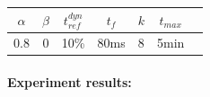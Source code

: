 		\begin{center}
		\begin{tabular}{ |c|c|c|c|c|c|c| } 
		\hline
		$\alpha$ & $\beta$ & $t_{ref}^{dyn}$ & $t_f$ & $k$ & $t_{max}$ \\
		\hline
		0.8 & 0 & 10\% & 80ms & 8 & 5min \\
		\hline
		\end{tabular}
		\label{tab:directional_phase_adjustment_comparison}
		\end{center}
		
		\paragraph{Experiment results:\nl}
		
